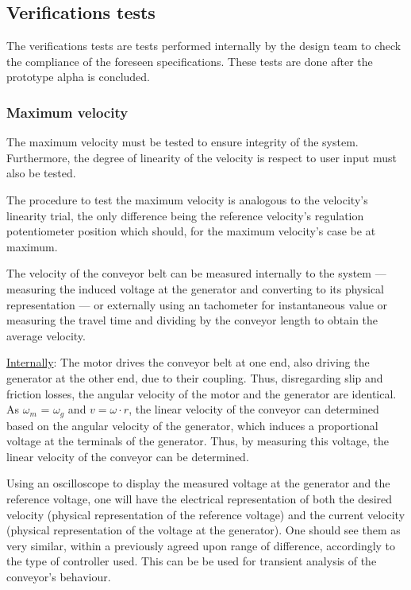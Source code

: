 \documentclass[11pt]{article}
\begin{document}
\subsection{Verifications tests}
\label{sec:orgab3743d}
The verifications tests are tests performed internally by the design team to
check the compliance of the foreseen specifications. These tests are done after
the prototype alpha is concluded.

\subsubsection{Maximum velocity}
\label{sec:org2d9e8e9}
The maximum velocity must be tested to ensure integrity of the
system. Furthermore, the degree of linearity of the velocity is respect to user
input must also be tested.

The procedure to test the maximum velocity is analogous to the velocity's
linearity trial, the only difference being the reference velocity’s regulation potentiometer position which should, for the maximum velocity’s case be at maximum.

The velocity of the conveyor belt can be measured internally to the system ---
measuring the induced voltage at the generator and converting to its physical
representation --- or externally using an tachometer for instantaneous value or
measuring the travel time and dividing by the conveyor length to obtain the
average velocity.

\uline{Internally}: The motor drives the conveyor belt at one end, also driving the
generator at the other end, due to their coupling. Thus, disregarding slip and
friction losses, the angular velocity of the motor and the generator are
identical. As \(\omega_m\) = \(\omega_g\) and \(v = \omega \cdot r\), the linear velocity of the conveyor can determined based on the angular velocity of the generator, which induces a proportional voltage at the terminals of the generator. Thus, by measuring this voltage, the linear velocity of the conveyor can be determined.

Using an oscilloscope to display the measured voltage at the generator and the
reference voltage, one will have the electrical representation of both the
desired velocity (physical representation of the reference voltage) and the
current velocity (physical representation of the voltage at the generator). 
One should see them as very similar, within a previously agreed upon range of
difference, accordingly to the type of controller used. This can be be used for
transient analysis of the conveyor's behaviour.
\end{document}
